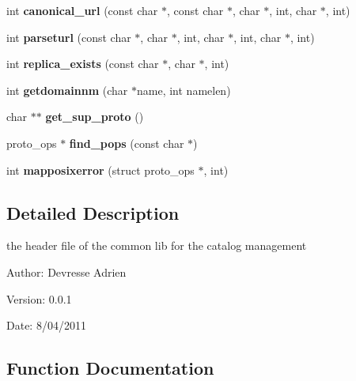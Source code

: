 \begin{CompactItemize}
\item 
int \textbf{canonical\_\-url} (const char $\ast$, const char $\ast$, char $\ast$, int, char $\ast$, int)\label{gfal__common__catalog_8h_845c890f2d493921bd587158fab72d65}

\item 
int \textbf{parseturl} (const char $\ast$, char $\ast$, int, char $\ast$, int, char $\ast$, int)\label{gfal__common__catalog_8h_70868bce152313f31e24982453f10723}

\item 
int \textbf{replica\_\-exists} (const char $\ast$, char $\ast$, int)\label{gfal__common__catalog_8h_ac34379d44fb4037af134b34a9aae030}

\item 
int \textbf{getdomainnm} (char $\ast$name, int namelen)\label{gfal__common__catalog_8h_446a829e4f333d3a0364ab0f2b5a2dc7}

\item 
char $\ast$$\ast$ \textbf{get\_\-sup\_\-proto} ()\label{gfal__common__catalog_8h_03347619db3b30ef54ae6a98e351e21f}

\item 
proto\_\-ops $\ast$ \textbf{find\_\-pops} (const char $\ast$)\label{gfal__common__catalog_8h_40d4c392e45e16062bc90caf0ebfa436}

\item 
int \textbf{mapposixerror} (struct proto\_\-ops $\ast$, int)\label{gfal__common__catalog_8h_c8360922877ec368815d412209e862a2}

\end{CompactItemize}


\subsection{Detailed Description}
the header file of the common lib for the catalog management 

\begin{Desc}
\item[Author:]Devresse Adrien \end{Desc}
\begin{Desc}
\item[Version:]0.0.1 \end{Desc}
\begin{Desc}
\item[Date:]8/04/2011 \end{Desc}


\subsection{Function Documentation}
